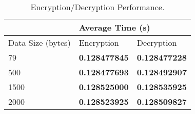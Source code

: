 \begin{table}[h!]
	\centering
	\def\arraystretch{1.5}
	\begin{tabular}{|l|l|l|} \cline{2-3}
		\multicolumn{1}{l|}{} & \multicolumn{2}{l|}{Average Time (s)} \\ \hline
		\centering Data Size (bytes) & Encryption & Decryption  \\ \hline
		79 & \textbf{0.128477845} & \textbf{0.128477228}	      \\ \hline
		500 & \textbf{0.128477693} & \textbf{0.128492907}	      \\ \hline
		1500 & \textbf{0.128525000} & \textbf{0.128535925}	      \\ \hline
		2000 & \textbf{0.128523925} & \textbf{0.128509827}            \\ \hline
	\end{tabular}
	\caption{Encryption/Decryption Performance.}
	\label{tab:data-performance}
\end{table}
